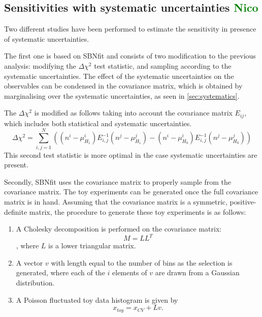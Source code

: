 \documentclass[a4paper]{article}
\begin{document}
\subsection{Sensitivities with systematic uncertainties \textcolor{green}{Nico}}
\label{subsec:sensitivity_syst_uncertainty}
Two different studies have been performed to estimate the sensitivity in presence of systematic uncertainties.

The first one is based on SBNfit and consists of two modification to the previous analysis: modifying the $\Delta \chi^2$ test statistic, and sampling according to the systematic uncertainties.
The effect of the systematic uncertainties on the observables can be condensed in the covariance matrix, which is obtained by marginalising over the systematic uncertainties, as seen in \ref{sec:systematics}.

The $\Delta \chi^2$ is modified as follows taking into account the covariance matrix $E_{ij}$, which includes both statistical and systematic uncertainties.
\begin{equation}
\label{eqn:deltachi2_systematic}
\Delta\chi^2 = \sum_{i,j=1}^{N}\left( (n^i - \mu^i_{H_1})E_{i,j}^{-1}(n^j - \mu^j_{H_1}) - (n^i - \mu^i_{H_0})E_{i,j}^{-1}(n^j - \mu^j_{H_0})\right)
\end{equation}
This second test statistic is more optimal in the case systematic uncertainties are present.

Secondly, SBNfit uses the covariance matrix to properly sample from the covariance matrix.
The toy experiments can be generated once the full covariance matrix is in hand. Assuming that the covariance matrix is a symmetric, positive-definite matrix, the procedure to generate these toy experiments is as follows:
\begin{enumerate}
    \item A Cholesky decomposition \cite{bib:cholesky} is performed on the covariance matrix: $$M = LL^{T}$$,
    where $L$ is a lower triangular matrix.
    \item A vector $v$ with length equal to the number of bins as the selection is generated, where each of the $i$ elements of $v$ are drawn from a Gaussian distribution.
    \item A Poisson fluctuated toy data histogram is given by
$$x_{toy} = x_{CV} + Lv.$$
\end{enumerate}
\end{document}
